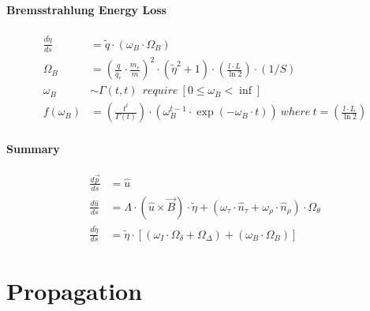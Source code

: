\documentclass[review]{elsarticle}
\begin{document}
\paragraph{Bremsstrahlung Energy Loss}
\begin{equation} \begin{alignedat}{-1}
    \frac{d\tilde{\eta}}{ds}&=\tilde{q}\cdot\left(\omega_{B}\cdot\Omega_{B}\right) \\
    \Omega_{B}&={\left(\frac{q}{q_{e}}\cdot\frac{m_{e}}{m}\right)}^{2}\cdot(\tilde{\eta}^{2}+1)\cdot\left(\frac{l\cdot L}{\ln{2}}\right)\cdot(1/S) \\
    \omega_{B}&\sim\Gamma\left(t,t\right)\ \ require\ \left[0\leq\omega_{B}<\inf\right] \\ 
    f\left(\omega_{B}\right)&=\left(\frac{t^t}{\Gamma\left(t\right)}\right)\cdot\left(\omega_{B}^{t-1}\cdot\exp{\left(-\omega_{B}\cdot t\right)}\right)\ where\ t=\left(\frac{l\cdot L}{\ln{2}}\right)
\end{alignedat} \end{equation} 

\paragraph{Summary}
\begin{equation} \begin{alignedat}{-1}
    \frac{d\vec{p}}{ds}&=\hat{u} \\
    \frac{d\hat{u}}{ds}&=\Lambda\cdot(\hat{u}\times\vec{B})\cdot\tilde{\eta}+(\omega_{\tau}\cdot\hat{n}_{\tau}+\omega_{\rho}\cdot\hat{n}_{\rho})\cdot\Omega_{\theta} \\
    \frac{d\tilde{\eta}}{ds}&=\tilde{\eta}\cdot\left[\left(\omega_{I}\cdot\Omega_{\delta}+\Omega_{\Delta}\right)+\left(\omega_{B}\cdot\Omega_{B}\right)\right]
\end{alignedat} \end{equation} 

\section{Propagation}
\end{document}
